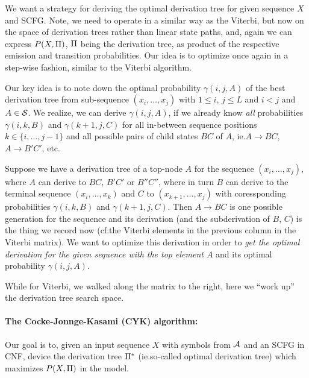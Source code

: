 We want a strategy for deriving the optimal derivation tree for given sequence
\(X\) and SCFG\@.  Note, we need to operate in a similar way as the Viterbi, but
now on the space of derivation trees rather than linear state paths, and, again
we can express \(P(X,\Pi)\), \(\Pi\) being the derivation tree, as product
of the respective emission and transition probabilities.  Our idea is to
optimize once again in a step-wise fashion, similar to the Viterbi algorithm.

Our key idea is to note down the optimal probability \(\gamma(i,j,A)\) of the
best derivation tree from sub-sequence \((x_i,\dotsc,x_j)\) with \(1\leq i\),
\(j\leq L\) and \(i<j\) and \(A\in\mathcal{S}\).  We realize, we can derive
\(\gamma(i,j,A)\), if we already know \emph{all} probabilities \(\gamma(i,k,B)\)
and \(\gamma(k+1,j,C)\) for all in-between sequence positions
\(k\in\{i,\dotsc,j-1\}\) and all possible pairs of child states \(BC\) of \(A\),
ie.\@ \(A\to BC\), \(A\to B'C'\), etc\@.

Suppose we have a derivation tree of a top-node \(A\) for the sequence
\((x_i,\dotsc,x_j)\), where \(A\) can derive to \(BC\), \(B'C'\) or \(B''C''\),
where in turn \(B\) can derive to the terminal sequence \((x_i,\dotsc,x_k)\) and
\(C\) to \((x_{k+1},\dotsc,x_j)\) with coressponding probabilities
\(\gamma(i,k,B)\) and \(\gamma(k+1,j,C)\).  Then \(A\to BC\) is one possible
generation for the sequence and its derivation (and the subderivation of \(B\),
\(C\)) is the thing we record now (cf.\@ the Viterbi elements in the previous
column in the Viterbi matrix).  We want to optimize this derivation in order
to \emph{get the optimal derivation for the given sequence with the top element
\(A\)} and its optimal probability \(\gamma(i,j,A)\).

While for Viterbi, we walked along the matrix to the right, here we
\enquote{work up} the derivation tree search space.

\paragraph{The Cocke-Jonnge-Kasami (CYK) algorithm:}  Our goal is to, given an
input sequence \(X\) with symbols from \(\mathcal{A}\) and an SCFG in CNF\@,
device the derivation tree \(\Pi^*\) (ie.\@ so-called optimal derivation tree)
which maximizes \(P(X,\Pi)\) in the model.

